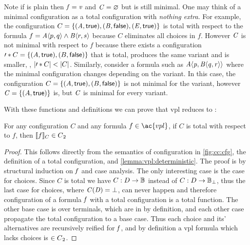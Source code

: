 Note if \fV{} is plain then $\mathit{f}{} = \mathit{v}$ and $\mathit{C} = \varnothing$ but is
still minimal. One may think of a minimal configuration as a total configuration
with \emph{nothing extra}. For example, the configuration $C = \{\kf{(A,\true),
  (B,\false),(E,\true)}\}$ is total with respect to the formula $f =
\chc[A]{p,q}\wedge\chc[B]{r,s}$ because $C$ eliminates all choices in $f$.
However $\mathit{C}$ is not minimal with respect to $f$ because there exists a
configuration $\prime*{C} = \set{(A,\true), (B,\false)}$ that is total, produces
the same variant and is smaller, \ie{}, $|\prime*{C}| <
|C|$. Similarly, consider a formula such as $\chc[A]{\pV{},
  \chc[B]{\qV{}, \rV{}}}$ where the minimal configuration changes depending on
the variant. In this case, the configuration $C = \set{(A, \true), (B, \false)}$
is not minimal for the  variant, however $\kf{C} =
\set{(A,\true)}$ is, but $\mathit{C}$ is minimal for every  variant.

With these functions and definitions we can prove that \ac{vpl} reduces to
\pl{}:
%
\begin{theorem}%
  \label{thm:vpltopl}
  For any configuration $C$ and any formula $f \in \ac{vpl}$, if $C$ is total
  with respect to $f$, then $\sem[C]{f} \in \pl{}$
\end{theorem}
%
\begin{proof}
  This follows directly from the semantics of configuration in
  \autoref{fig:cc:cfg}, the definition of a total configuration, and
  \autoref{lemma:vpl:deterministic}. The proof is by structural induction on
  $\mathit{f}$ and case analysis. The only interesting case is the case for choices.
  Since $C$ is total we have $C : D \rightarrow \mathbb{B}{}$ instead of $C : D
  \rightarrow \mathbb{B}{}_{\bot}$, thus the last case for choices, where
  $\mathit{C(D)} = \bot$, can never happen and therefore configuration of a formula
  $\mathit{f}$ with a total configuration is a total function. The other base case
  is over terminals, which are in \pl{} by definition, and each other case
  propagate the total configuration to a base case. Thus each choice and its'
  alternatives are recursively reified for $\mathit{f}$, and by definition a
  \ac{vpl} formula which lacks choices is $\in {C\textsubscript{2}}{}$.
\end{proof}


